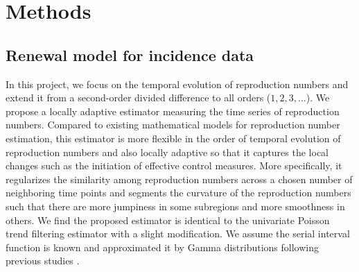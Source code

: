 \section{Methods}

\subsection{Renewal model for incidence data} 



In this project, we focus on the temporal evolution of reproduction numbers and extend it from a second-order divided difference to all orders ($1,2,3,...$). We propose a locally adaptive estimator measuring the time series of reproduction numbers. Compared to existing mathematical models for reproduction number estimation, this estimator is more flexible in the order of temporal evolution of reproduction numbers and also locally adaptive so that it captures the local changes such as the initiation of effective control measures. More specifically, it regularizes the similarity among reproduction numbers across a chosen number of neighboring time points and segments the curvature of the reproduction numbers such that there are more jumpiness in some subregions and more smoothness in others. We find the proposed estimator is identical to the univariate Poisson trend filtering estimator with a slight modification. We assume the serial interval function is known and approximated it by Gamma distributions following previous studies \citep{cori2013new,thompson2019improved,abry2020spatial,pascal2022nonsmooth}.


